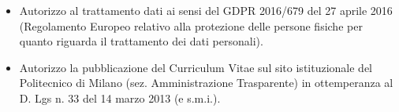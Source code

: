 \begin{itemize}
\item Autorizzo al trattamento dati ai sensi del GDPR 2016/679 del 27 aprile 2016 (Regolamento Europeo relativo alla protezione delle persone fisiche per quanto riguarda il trattamento dei dati personali).
\item Autorizzo la pubblicazione del Curriculum Vitae sul sito istituzionale del Politecnico di Milano (sez. Amministrazione Trasparente) in ottemperanza al D. Lgs n. 33 del 14 marzo 2013 (e s.m.i.).
\end{itemize}